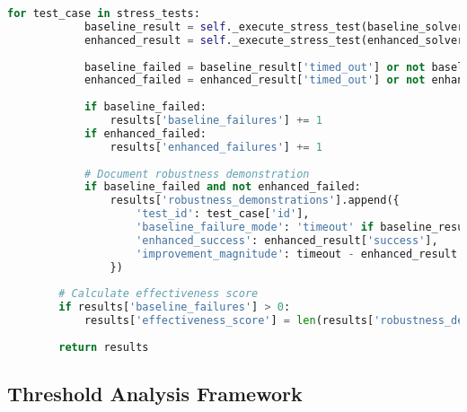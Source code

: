 \begin{lstlisting}[language=Python, caption=Adversarial Test Generation for Robustness Boundary Analysis]
        for test_case in stress_tests:
            baseline_result = self._execute_stress_test(baseline_solver, test_case, timeout)
            enhanced_result = self._execute_stress_test(enhanced_solver, test_case, timeout)
            
            baseline_failed = baseline_result['timed_out'] or not baseline_result['success']
            enhanced_failed = enhanced_result['timed_out'] or not enhanced_result['success']
            
            if baseline_failed:
                results['baseline_failures'] += 1
            if enhanced_failed:
                results['enhanced_failures'] += 1
            
            # Document robustness demonstration
            if baseline_failed and not enhanced_failed:
                results['robustness_demonstrations'].append({
                    'test_id': test_case['id'],
                    'baseline_failure_mode': 'timeout' if baseline_result['timed_out'] else 'error',
                    'enhanced_success': enhanced_result['success'],
                    'improvement_magnitude': timeout - enhanced_result.get('execution_time', timeout)
                })
        
        # Calculate effectiveness score
        if results['baseline_failures'] > 0:
            results['effectiveness_score'] = len(results['robustness_demonstrations']) / results['baseline_failures']
        
        return results
\end{lstlisting}

\subsection{Threshold Analysis Framework}
\label{appendix:threshold-analysis}

